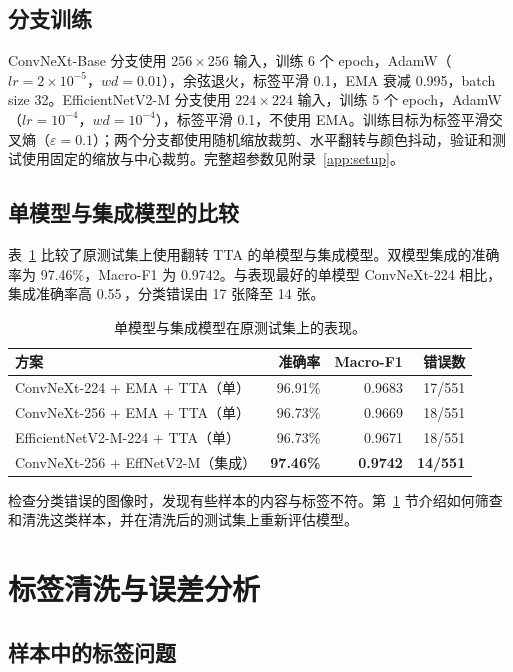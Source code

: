 \documentclass[11pt,a4paper,UTF8,fontset=windows]{ctexart}
\newcommand{\best}[1]{\textbf{#1}}
\newcommand{\pp}{\,\text{pp}}
\begin{document}
\subsection{分支训练}

ConvNeXt-Base 分支使用 $256\times256$ 输入，训练 6 个 epoch，AdamW（$lr=2\times10^{-5}$，$wd=0.01$），余弦退火，标签平滑 0.1，EMA 衰减 0.995，batch size 32。EfficientNetV2-M 分支使用 $224\times224$ 输入，训练 5 个 epoch，AdamW（$lr=10^{-4}$，$wd=10^{-4}$），标签平滑 0.1，不使用 EMA。训练目标为标签平滑交叉熵（$\varepsilon=0.1$）；两个分支都使用随机缩放裁剪、水平翻转与颜色抖动，验证和测试使用固定的缩放与中心裁剪。完整超参数见附录~\ref{app:setup}。

\subsection{单模型与集成模型的比较}

表~\ref{tab:candidates} 比较了原测试集上使用翻转 TTA 的单模型与集成模型。双模型集成的准确率为 97.46\%，Macro-F1 为 0.9742。与表现最好的单模型 ConvNeXt-224 相比，集成准确率高 0.55\pp，分类错误由 17 张降至 14 张。

\begin{table}[H]
\centering
\small
\caption{单模型与集成模型在原测试集上的表现。}
\label{tab:candidates}
\begin{tabular}{lrrr}
\toprule
方案 & 准确率 & Macro-F1 & 错误数 \\
\midrule
ConvNeXt-224 + EMA + TTA（单） & 96.91\% & 0.9683 & 17/551 \\
ConvNeXt-256 + EMA + TTA（单） & 96.73\% & 0.9669 & 18/551 \\
EfficientNetV2-M-224 + TTA（单） & 96.73\% & 0.9671 & 18/551 \\
ConvNeXt-256 + EffNetV2-M（集成） & \best{97.46\%} & \best{0.9742} & \best{14/551} \\
\bottomrule
\end{tabular}

\end{table}

检查分类错误的图像时，发现有些样本的内容与标签不符。第~\ref{sec:audit} 节介绍如何筛查和清洗这类样本，并在清洗后的测试集上重新评估模型。

\section{标签清洗与误差分析}
\label{sec:audit}

\subsection{样本中的标签问题}
\end{document}
